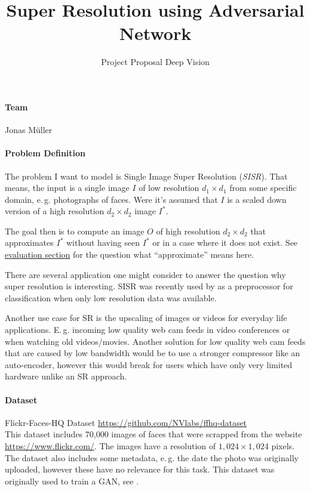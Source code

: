 \documentclass{scrartcl}
\author{}
\title{Super Resolution using Adversarial Network}
\subtitle{Project Proposal Deep Vision}
\date{\vspace{-4em}}
\begin{document}
\maketitle

\paragraph{Team}
Jonas Müller

\paragraph{Problem Definition}
The problem I want to model is Single Image Super Resolution (\emph{SISR}).
That means, the input is a single image \(I\) of low resolution \(d_1 \times d_1\) from some specific domain, e.\,g. photographs of faces.
Were it's assumed that \(I\) is a scaled down version of a high resolution \(d_2 \times d_2\) image \(I^*\).

The goal then is to compute an image \(O\) of high resolution $d_2 \times d_2$ that approximates \(I^*\) without having seen $I^*$ or in a case where it does not exist.
See \hyperlink{evaluation}{evaluation section} for the question what ``approximate'' means here.
\smallskip

There are several application one might consider to answer the question why super resolution is interesting.
SISR was recently used by \cite{jing2020feature} as a preprocessor for classification when only low resolution data was available.

Another use case for SR is the upscaling of images or videos for everyday life applications.
E.\,g. incoming low quality web cam feeds in video conferences or when watching old videos/movies.
Another solution for low quality web cam feeds that are caused by low bandwidth would be to use a stronger compressor like an auto-encoder, however this would break for users which have only very limited hardware unlike an SR approach.

\paragraph{Dataset}
Flickr-Faces-HQ Dataset \hfill \url{https://github.com/NVlabs/ffhq-dataset} \\
This dataset includes 70,000 images of faces that were scrapped from the website \url{https://www.flickr.com/}.
The images have a resolution of \(1,024 \times 1,024\) pixels.
The dataset also includes some metadata, e.\,g. the date the photo was originally uploaded, however these have no relevance for this task.
This dataset was originally used to train a GAN, see \cite{karras2019style}.
\end{document}
